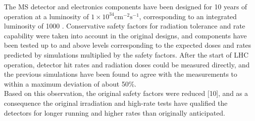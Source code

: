 The MS detector and electronics components have been designed for 10 years of operation
at a luminosity of $\mathrm{1\times 10^{34}cm^{-2} s^{-1}}$, corresponding to an integrated luminosity of 1000 \ifb. 
Conservative safety factors for radiation tolerance and rate capability were taken
into account in the original designs, and components have been tested up to and above
levels corresponding to the expected doses and rates predicted by simulations multiplied
by the safety factors. After the start of LHC operation, detector hit rates and radiation doses
could be measured directly, and the previous simulations have been found to agree with
the measurements to within a maximum deviation of about 50\%.
\\Based on this observation, the original safety factors were reduced [10], and as a consequence the original irradiation and high-rate tests have qualified the detectors for longer running and higher rates than originally anticipated.


